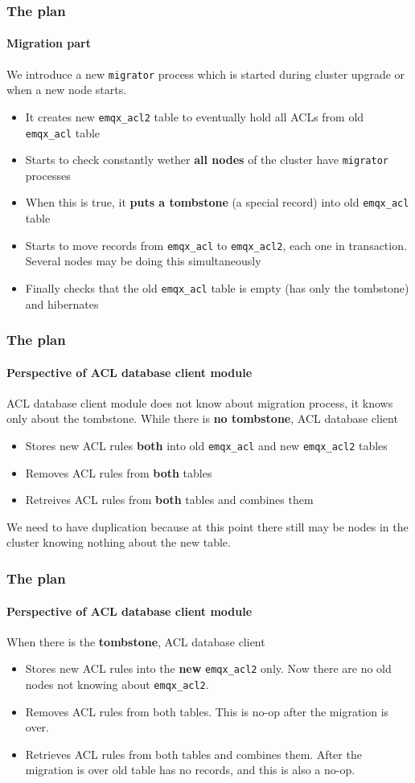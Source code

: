 \documentclass{beamer}
\begin{document}
\begin{frame}
    \frametitle{The plan}
    \framesubtitle{Migration part}

    We introduce a new \lstinline{migrator} process which is started during cluster upgrade or when a new node starts.
    \begin{itemize}
        \item It creates new \lstinline{emqx_acl2} table to eventually hold all ACLs from old \lstinline{emqx_acl} table
        \item Starts to check constantly wether \textbf{all nodes} of the cluster have \lstinline{migrator} processes
        \item When this is true, it \textbf{puts a tombstone} (a special record) into old \lstinline{emqx_acl} table
        \item Starts to move records from \lstinline{emqx_acl} to \lstinline{emqx_acl2}, each one in transaction. Several
        nodes may be doing this simultaneously
        \item Finally checks that the old \lstinline{emqx_acl} table is empty (has only the tombstone) and hibernates
    \end{itemize}
\end{frame}

\begin{frame}
    \frametitle{The plan}
    \framesubtitle{Perspective of ACL database client module}

    ACL database client module does not know about migration process, it knows only about the tombstone.
    While there is \textbf{no tombstone}, ACL database client
    \begin{itemize}
        \item Stores new ACL rules \textbf{both} into old \lstinline{emqx_acl} and new \lstinline{emqx_acl2} tables
        \item Removes ACL rules from \textbf{both} tables
        \item Retreives ACL rules from \textbf{both} tables and combines them
    \end{itemize}
    We need to have duplication because at this point
    there still may be nodes in the cluster knowing nothing about the new table.
\end{frame}

\begin{frame}
    \frametitle{The plan}
    \framesubtitle{Perspective of ACL database client module}

    When there is the \textbf{tombstone}, ACL database client
    \begin{itemize}
        \item Stores new ACL rules into the \textbf{new} \lstinline{emqx_acl2} only.
            Now there are no old nodes not knowing about \lstinline{emqx_acl2}.
        \item Removes ACL rules from both tables. This is no-op after the migration is over.
        \item Retrieves ACL rules from both tables and combines them. After the migration is over
            old table has no records, and this is also a no-op.
    \end{itemize}
\end{frame}
\end{document}
